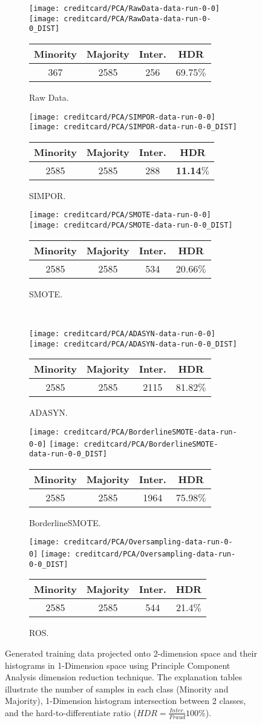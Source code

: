 \documentclass[a4paper,12pt]{article}
\newcommand{\image}[6]{%
  \begin{figure*}[h!]
  	\centering
  	\begin{subfigure}[t]{0.32\linewidth}	
  		\texttt{[image: creditcard/PCA/RawData-data-run-0-0]}
  		\texttt{[image: creditcard/PCA/RawData-data-run-0-0\_DIST]}
  		\begin{adjustbox}{width=\columnwidth,center}
  		\begin{tabular}{c|c|c|c}
  			Minority & Majority & Inter. & HDR  \\
  			\hline
  			367  & 2585  & 256 & 69.75\(\%\) \\
  		\end{tabular}
  		\end{adjustbox}
  		\caption{#1. }
  		\label{fig:RawData_hist}
  	\end{subfigure}
  	\hspace{0.1em}%
  	\begin{subfigure}[t]{0.32\linewidth}	
  		\texttt{[image: creditcard/PCA/SIMPOR-data-run-0-0]}
  		\texttt{[image: creditcard/PCA/SIMPOR-data-run-0-0\_DIST]}
  		\begin{adjustbox}{width=\columnwidth,center}
  		\begin{tabular}{c|c|c|c}
  			Minority & Majority & Inter. & HDR  \\
  			\hline
  			2585  & 2585  & 288 & \textbf{11.14\(\%\)} \\
  		\end{tabular}
  		\end{adjustbox}
  		\caption{#2. }
  		\label{fig:SIMPOR_hist}
  	\end{subfigure}
  	\hspace{0.1em}%
  	\begin{subfigure}[t]{0.32\linewidth}	
  		\texttt{[image: creditcard/PCA/SMOTE-data-run-0-0]}
  		\texttt{[image: creditcard/PCA/SMOTE-data-run-0-0\_DIST]}
  		\begin{adjustbox}{width=\columnwidth,center}
  		\begin{tabular}{c|c|c|c}
  			Minority & Majority & Inter. & HDR  \\
  			\hline
  			2585  & 2585  & 534 & 20.66\(\%\) \\
  		\end{tabular}
  		\end{adjustbox}
  		\caption{#3. }
  		\label{fig:SMOTE_hist}
  	\end{subfigure}
  	\\ 
  	\begin{subfigure}[t]{0.32\linewidth}	
  		\texttt{[image: creditcard/PCA/ADASYN-data-run-0-0]}
  		\texttt{[image: creditcard/PCA/ADASYN-data-run-0-0\_DIST]}
		\begin{adjustbox}{width=\columnwidth,center}
  		\begin{tabular}{c|c|c|c}
  			Minority & Majority & Inter. & HDR  \\
  			\hline
  			2585  & 2585  & 2115 & 81.82\(\%\) \\
  		\end{tabular}
  	\end{adjustbox}
  		\caption{#4. }
  		\label{fig:ADASYN_hist}
  	\end{subfigure}
  	\hspace{0.1em}%
  	\begin{subfigure}[t]{0.32\linewidth}	
  		\texttt{[image: creditcard/PCA/BorderlineSMOTE-data-run-0-0]}
  		\texttt{[image: creditcard/PCA/BorderlineSMOTE-data-run-0-0\_DIST]}
		\begin{adjustbox}{width=\columnwidth,center}
  		\begin{tabular}{c|c|c|c}
  			Minority & Majority & Inter. & HDR  \\
  			\hline
  			2585  & 2585  & 1964 & 75.98\(\%\) \\
  		\end{tabular}
  	\end{adjustbox}
  		\caption{#5. }
  		\label{fig:BorderlineSMOTE_hist}
  	\end{subfigure}
  	\hspace{0.1em}%
  	\begin{subfigure}[t]{0.32\linewidth}	
  		\texttt{[image: creditcard/PCA/Oversampling-data-run-0-0]}
  		\texttt{[image: creditcard/PCA/Oversampling-data-run-0-0\_DIST]}
		\begin{adjustbox}{width=\columnwidth,center}
  		\begin{tabular}{c|c|c|c}
  			Minority & Majority & Inter. & HDR  \\
  			\hline
  			2585  & 2585  & 544 & 21.4\(\%\) \\
  		\end{tabular}
  	\end{adjustbox}
  		\caption{#6. }
  		\label{fig:#1}
  	\end{subfigure}
  	
  	\caption{Generated training data projected onto 2-dimension space and their histograms in 1-Dimension space using Principle Component Analysis dimension reduction technique. The explanation tables illustrate the number of samples in each class (Minority and Majority), 1-Dimension histogram intersection between 2 classes, and the hard-to-differentiate ratio ($HDR = \frac{Inter.}{Fraud}100\%$).}
  	\label{fig:creditcard_plot}

  	
  \end{figure*}
}
\begin{document}
\image{Raw Data}{SIMPOR}{SMOTE}{ADASYN}{BorderlineSMOTE}{ROS} 
\end{document}
